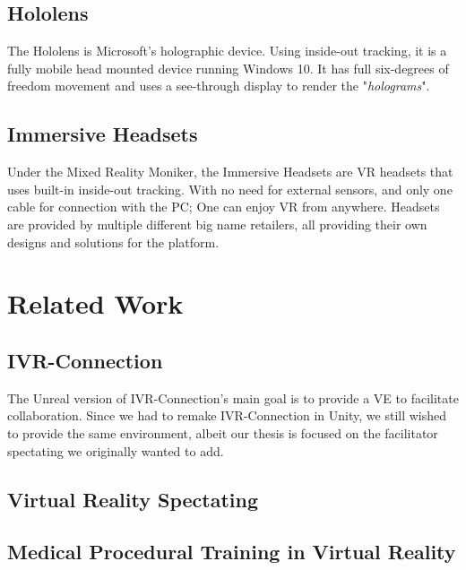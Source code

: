         \subsection{Hololens}
            The Hololens is Microsoft's holographic device. Using inside-out tracking, it is a fully mobile head mounted device running Windows 10. It has full six-degrees of freedom movement and uses a see-through display to render the "\emph{holograms}".
    
        \subsection{Immersive Headsets}
            Under the Mixed Reality Moniker, the Immersive Headsets are VR headsets that uses built-in inside-out tracking. With no need for external sensors, and only one cable for connection with the PC; One can enjoy VR from anywhere. Headsets are provided by multiple different big name retailers, all providing their own designs and solutions for the platform.
    
    \section{Related Work}
        
        \subsection{IVR-Connection}
            The Unreal version of IVR-Connection's main goal is to provide a VE to facilitate collaboration. Since we had to remake IVR-Connection in Unity, we still wished to provide the same environment, albeit our thesis is focused on the facilitator spectating we originally wanted to add.
        
        \subsection{Virtual Reality Spectating}
        
        \subsection{Medical Procedural Training in Virtual Reality}
